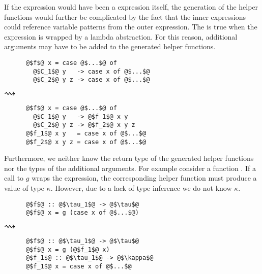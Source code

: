 If the  expression would have been a  expression itself, the generation of the helper functions would further be complicated by the fact that the inner  expressions could reference variable patterns from the outer  expression.
The is true when the  expression is wrapped by a lambda abstraction.
For this reason, additional arguments may have to be added to the generated helper functions.

\begin{center}
  \begin{minipage}[t]{0.3\textwidth}
    \begin{verbatim}
      @$f$@ x = case @$...$@ of
        @$C_1$@ y   -> case x of @$...$@
        @$C_2$@ y z -> case x of @$...$@
    \end{verbatim}
  \end{minipage}
  \begin{minipage}[c]{0.1\textwidth}
    $\mathlarger{\mathlarger{\mathlarger{\rightsquigarrow}}}$
  \end{minipage}
  \begin{minipage}[t]{0.35\textwidth}
    \begin{verbatim}
      @$f$@ x = case @$...$@ of
        @$C_1$@ y   -> @$f_1$@ x y
        @$C_2$@ y z -> @$f_2$@ x y z
      @$f_1$@ x y   = case x of @$...$@
      @$f_2$@ x y z = case x of @$...$@
    \end{verbatim}
  \end{minipage}
\end{center}

Furthermore, we neither know the return type of the generated helper functions nor the types of the additional arguments.
For example consider a function .
If a call to $g$ wraps the  expression, the corresponding helper function must produce a value of type $\kappa$.
However, due to a lack of type inference we do not know $\kappa$.
\begin{center}
  \begin{minipage}[t]{0.3\textwidth}
    \begin{verbatim}
      @$f$@ :: @$\tau_1$@ -> @$\tau$@
      @$f$@ x = g (case x of @$...$@)
    \end{verbatim}
  \end{minipage}
  \begin{minipage}[c]{0.1\textwidth}
    $\mathlarger{\mathlarger{\mathlarger{\rightsquigarrow}}}$
  \end{minipage}
  \begin{minipage}[t]{0.35\textwidth}
    \begin{verbatim}
      @$f$@ :: @$\tau_1$@ -> @$\tau$@
      @$f$@ x = g (@$f_1$@ x)
      @$f_1$@ :: @$\tau_1$@ -> @$\kappa$@
      @$f_1$@ x = case x of @$...$@
    \end{verbatim}
  \end{minipage}
\end{center}

